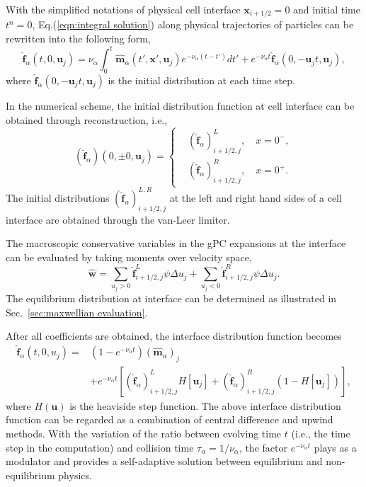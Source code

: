 \documentclass[preprint,3p,12pt,sort&compress]{elsarticle}
\begin{document}
With the simplified notations of physical cell interface $\mathbf x_{i+1/2}=0$ and initial time $t^n=0$, Eq.(\ref{eqn:integral solution}) along physical trajectories of particles can be rewritten into the following form,
\begin{equation}
\hat{\boldsymbol f}_\alpha(t,0,\mathbf u_j)=\nu_\alpha \int_{0}^{t} \hat{\boldsymbol m}_\alpha(t',\mathbf x',\mathbf u_j)e^{-\nu_\alpha (t-t')}dt' +e^{-\nu_\alpha t}\hat{\boldsymbol f}_\alpha(0,-\mathbf u_j t,\mathbf u_j),
\label{eqn:interface integral solution}
\end{equation}
where $\hat{\boldsymbol f}_\alpha(0,-\mathbf u_j t,\mathbf u_j)$ is the initial distribution at each time step.

In the numerical scheme,
the initial distribution function at cell interface can be obtained through reconstruction, i.e.,
\begin{equation}
(\hat{\boldsymbol f}_\alpha)(0,\pm 0,\mathbf u_j)=\left\{
\begin{aligned}
&(\hat{\boldsymbol f}_\alpha)_{i+1/2,j}^L, \quad x= 0^-, \\
&(\hat{\boldsymbol f}_\alpha)_{i+1/2,j}^R, \quad x= 0^+.
\end{aligned}
\right.
\label{eqn:f0 reconstruct 1st}
\end{equation}
The initial distributions $(\hat{\boldsymbol f}_\alpha)_{i+1/2,j}^{L,R}$ at the left and right hand sides of a cell interface are obtained through the van-Leer limiter.

The macroscopic conservative variables in the gPC expansions at the interface can be evaluated by taking moments over velocity space,
\begin{equation*}
\hat{\boldsymbol w}=\sum_{u_j>0} \hat{\boldsymbol f}_{i+1/2,j}^L\psi \Delta u_j +\sum_{u_j<0} \hat{\boldsymbol f}_{i+1/2,j}^R\psi \Delta u_j.
\end{equation*}
The equilibrium distribution at interface can be determined as illustrated in Sec.\ \ref{sec:maxwellian evaluation}.

After all coefficients are obtained, the interface distribution function becomes 
\begin{equation}
\begin{aligned}
\hat{\boldsymbol f}_\alpha(t,0,u_j)=&\left(1-e^{-\nu_\alpha t}\right) (\hat{\boldsymbol m}_{\alpha})_{j} \\
&+e^{-\nu_\alpha t}\left[(\hat{\boldsymbol f}_\alpha)_{i+1/2,j}^L H\left[\mathbf u_j\right] + (\hat{\boldsymbol f}_\alpha)_{i+1/2,j}^R (1-H\left[\mathbf u_j\right])\right],
\end{aligned}
\label{eqn:interface distribution gPC 1st}
\end{equation}
where $H(\mathbf u)$ is the heaviside step function.
The above interface distribution function can be regarded as a combination of central difference and upwind methods.
With the variation of the ratio between evolving time $t$ (i.e., the time step in the computation) and collision time $\tau_\alpha=1/\nu_\alpha$, the factor $e^{-\nu_\alpha t}$ plays as a modulator and provides a self-adaptive solution between equilibrium and non-equilibrium physics. 
\end{document}
